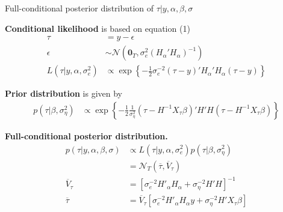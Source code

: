 \documentclass[notes,blackandwhite,mathsans,usenames,dvipsnames]{beamer}
\begin{document}
\begin{frame}{Full-conditional posterior distribution of $\tau|y,\alpha,\beta,\sigma$}

\small
\bigskip\textbf{Conditional likelihood} {\color{mcxs2}is based on equation} (1)
\begin{align*}
\tau &= y-\epsilon\\
\epsilon &\sim\mathcal{N}\left(\mathbf{0}_T, \sigma^2_e (H_{\alpha}'H_{\alpha})^{-1}\right)\\
L\left(\tau|y,\alpha,\sigma^2_e\right)&\propto\exp\left\{-\frac{1}{2}\sigma^{-2}_e(\tau-y)'H_\alpha'H_\alpha(\tau-y)  \right\}
\end{align*}

\smallskip\textbf{Prior distribution} {\color{mcxs2}is given by}
\begin{align*}
p\left(\tau|\beta,\sigma^2_\eta\right) &\propto \exp\left\{-\frac{1}{2}\frac{1}{\sigma^2_\eta} \left(\tau-H^{-1} X_\tau \beta\right)'H'H\left(\tau-H^{-1} X_\tau \beta\right) \right\}
\end{align*}

\smallskip\textbf{Full-conditional posterior distribution.}
\begin{align*}
p\left( \tau|y,\alpha,\beta,\sigma \right)&\propto L\left(\tau|y,\alpha,\sigma^2_e\right)p\left(\tau|\beta,\sigma^2_\eta\right)\\
&= \mathcal{N}_T\left(\overline{\tau},\overline{V}_\tau\right)\\
\overline{V}_\tau &= \left[\sigma^{-2} _eH'_\alpha H_\alpha + \sigma^{-2} _\eta H' H \right]^{-1}\\
\overline{\tau} &= \overline{V}_\tau\left[\sigma^{-2} _eH'_\alpha H_\alpha y + \sigma^{-2} _\eta H' X_\tau \beta \right]
\end{align*}

\end{frame}
\end{document}

